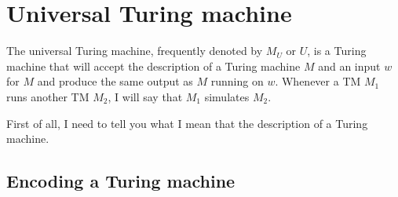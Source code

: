 \section{Universal Turing machine}

The universal Turing machine, frequently denoted by
$M_U$ or $U$, is a Turing machine that
will accept the description of a Turing machine $M$ and an input $w$
for $M$ and produce the same output as $M$ running on $w$.
Whenever a TM $M_1$ runs another TM $M_2$, I will say that $M_1$
simulates $M_2$.

First of all, I need to tell you what I mean that
the description of a Turing machine.

\subsection{Encoding a Turing machine}

